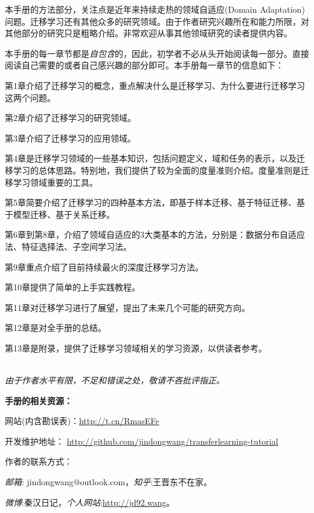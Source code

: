 本手册的方法部分，关注点是近年来持续走热的领域自适应(Domain Adaptation)问题。迁移学习还有其他众多的研究领域。由于作者研究兴趣所在和能力所限，对其他部分的研究只是粗略介绍。非常欢迎从事其他领域研究的读者提供内容。

本手册的每一章节都是\textit{自包含}的，因此，初学者不必从头开始阅读每一部分。直接阅读自己需要的或者自己感兴趣的部分即可。本手册每一章节的信息如下：

第1章介绍了迁移学习的概念，重点解决什么是迁移学习、为什么要进行迁移学习这两个问题。

第2章介绍了迁移学习的研究领域。

第3章介绍了迁移学习的应用领域。

第4章是迁移学习领域的一些基本知识，包括问题定义，域和任务的表示，以及迁移学习的总体思路。特别地，我们提供了较为全面的度量准则介绍。度量准则是迁移学习领域重要的工具。

第5章简要介绍了迁移学习的四种基本方法，即基于样本迁移、基于特征迁移、基于模型迁移、基于关系迁移。

第6章到第8章，介绍了领域自适应的3大类基本的方法，分别是：数据分布自适应法、特征选择法、子空间学习法。

第9章重点介绍了目前持续最火的深度迁移学习方法。

第10章提供了简单的上手实践教程。

第11章对迁移学习进行了展望，提出了未来几个可能的研究方向。

第12章是对全手册的总结。

第13章是附录，提供了迁移学习领域相关的学习资源，以供读者参考。

\textit{\\由于作者水平有限，不足和错误之处，敬请不吝批评指正。}

\textbf{手册的相关资源：}

网站(内含勘误表)：\url{http://t.cn/RmasEFe}

开发维护地址： \url{http://github.com/jindongwang/transferlearning-tutorial}

作者的联系方式：

\textit{邮箱}: {\ttfamily jindongwang@outlook.com}，\textit{知乎}:{\ttfamily 王晋东不在家}。

\textit{微博}:{\ttfamily 秦汉日记}，\textit{个人网站}:\url{http://jd92.wang}。
